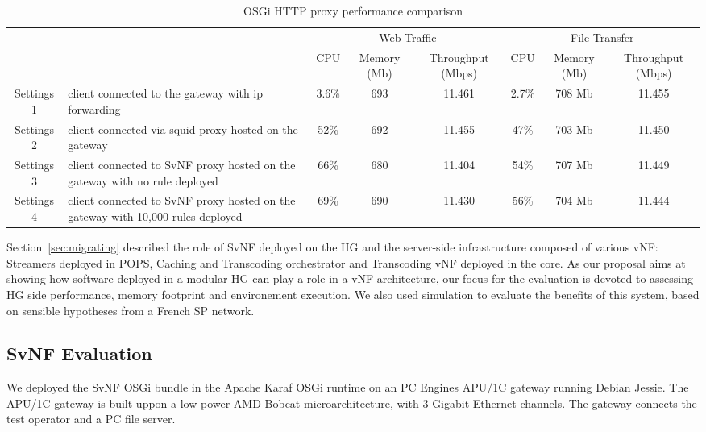 \begin{table*}
	\centering
	\begin{tabular}{| c | p{}|c |c |c || c |c |c |}
	
	
 	    \multicolumn{2}{c}{} & \multicolumn{3}{c}{Web Traffic} 		  & \multicolumn{3}{c}{File Transfer} \\
 	     \cline{3-8}	
             \multicolumn{2}{c|}{} & CPU 			& Memory (Mb) 		& Throughput (Mbps)	& CPU 		& Memory (Mb)		& Throughput (Mbps) \\\hline   
Settings 1 & client connected to the gateway with ip forwarding &   3.6\% 		& 693 		& 11.461		& 2.7\%		& 708 Mb		& 11.455 \\\hline
Settings 2 & client connected via squid proxy hosted on the gateway   &   52\%        & 692 		& 11.455		& 47\%		& 703 Mb		& 11.450 \\\hline
Settings 3 & client connected to SvNF proxy hosted on the gateway with no rule deployed &   66\%		& 680 		& 11.404		& 54\%		& 707 Mb		& 11.449 \\\hline
Settings 4 & client connected to SvNF proxy hosted on the gateway with 10,000 rules deployed   &   69\%        & 690 		& 11.430		& 56\%		& 704 Mb		& 11.444 \\\hline
	
	            
	\end{tabular}
	\caption{
	OSGi HTTP proxy performance comparison
	\label{tab:perf-comparison}
	}
	
\end{table*}

Section~\ref{sec:migrating} described the role of SvNF deployed on the HG and the server-side infrastructure composed of various vNF: Streamers deployed in POPS, Caching and Transcoding orchestrator and Transcoding vNF deployed in the core.
As our proposal aims at showing how software deployed in a modular HG can play a role in a vNF architecture, our focus for the evaluation is devoted to assessing HG side performance, memory footprint and environement execution. We also used simulation to evaluate the benefits of this system, based on sensible hypotheses from a French SP network.


\subsection{SvNF Evaluation }\label{Testbed}

We deployed the SvNF OSGi bundle in the Apache Karaf OSGi runtime on an PC Engines APU/1C gateway running Debian Jessie. 
The APU/1C gateway is built uppon a low-power AMD Bobcat microarchitecture, with 3 Gigabit Ethernet channels. The gateway connects the test operator and a PC file server.

